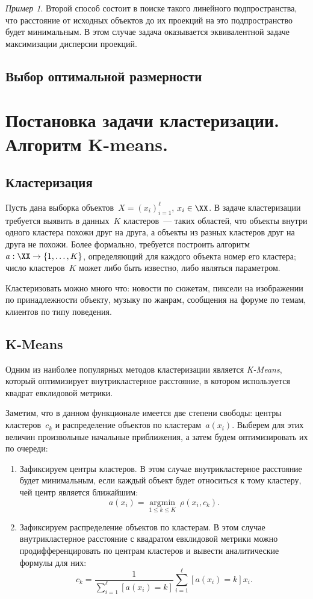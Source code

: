 \documentclass[a4paper, 12pt]{article}
\DeclareMathOperator{\argmin}{argmin }
\theoremstyle{plain} %
\theoremstyle{definition} %
\theoremstyle{remark} %
\newtheorem{example}{Пример}
\begin{document}
\begin{example}
Второй способ состоит в поиске такого линейного подпространства,
что расстояние от исходных объектов до их проекций на это подпространство
будет минимальным.
В этом случае задача оказывается эквивалентной задаче максимизации дисперсии проекций.

\subsection{Выбор оптимальной размерности}

\section{Постановка задачи кластеризации. Алгоритм K-means.}

\subsection{Кластеризация}

Пусть дана выборка объектов~$X = (x_i)_{i = 1}^{\ell}$, $x_i \in \XX$.
В задаче кластеризации требуется выявить в данных~$K$ кластеров~---
таких областей, что объекты внутри одного кластера похожи друг на друга,
а объекты из разных кластеров друг на друга не похожи.
Более формально, требуется построить алгоритм~$a: \XX \to \{1, \dots, K\}$,
определяющий для каждого объекта номер его кластера;
число кластеров~$K$ может либо быть известно, либо являться параметром.

Кластеризовать можно много что: новости по сюжетам, пиксели на изображении по принадлежности объекту,
музыку по жанрам, сообщения на форуме по темам, клиентов по типу поведения.

\subsection{K-Means}
Одним из наиболее популярных методов кластеризации является \emph{K-Means},
который оптимизирует внутрикластерное расстояние,
в котором используется квадрат евклидовой метрики.

Заметим, что в данном функционале имеется две степени свободы:
центры кластеров~$c_k$ и распределение объектов по кластерам~$a(x_i)$.
Выберем для этих величин произвольные начальные приближения,
а затем будем оптимизировать их по очереди:
\begin{enumerate}
    \item Зафиксируем центры кластеров.
        В этом случае внутрикластерное расстояние будет минимальным,
        если каждый объект будет относиться к тому кластеру, чей центр является ближайшим:
        \[
            a(x_i)
            =
            \underset{1 \leq k \leq K}{\argmin}~
                \rho(x_i, c_k).
        \]
    \item Зафиксируем распределение объектов по кластерам.
        В этом случае внутрикластерное расстояние с квадратом евклидовой метрики можно продифференцировать
        по центрам кластеров и вывести аналитические формулы для них:
        \[
            c_k
            =
            \frac{1}{\sum_{i = 1}^{\ell} [a(x_i) = k]}
            \sum_{i = 1}^{\ell}
                [a(x_i) = k] x_i.
        \]
\end{enumerate}


\end{example}
\end{document}
